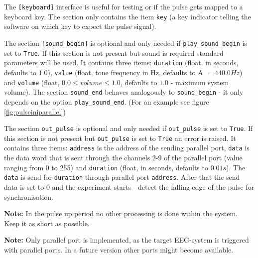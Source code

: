 \documentclass[12pt,a4paper]{book}
\begin{document}
The \verb|[keyboard]| interface is useful for testing or if the pulse gets mapped to a keyboard key. The section only contains the item \verb|key| (a key indicator telling the software on which key to expect the pulse signal).

The section \verb|[sound_begin]| is optional and only needed if \verb|play_sound_begin| is set to \verb|True|. If this section is not present but sound is required standard parameters will be used. It contains three items: \verb|duration| (float, in seconds, defaults to $1.0$), \verb|value| (float, tone frequency in Hz, defaults to A $= 440.0 Hz$) and \verb|volume| (float, $0.0 \le volume \le 1.0$, defaults to $1.0$ - maximum system volume). The section \verb|sound_end| behaves analogously to \verb|sound_begin| - it only depends on the option \verb|play_sound_end|. (For an example see figure \ref{fig:pulseiniparallel})

The section \verb|out_pulse| is optional and only needed if \verb|out_pulse| is set to \verb|True|. If this section is not present but \verb|out_pulse| is set to \verb|True| an error is raised. It contains three items: \verb|address| is the address of the sending parallel port, \verb|data| is the data word that is sent through the channels 2-9 of the parallel port (value ranging from 0 to 255) and \verb|duration| (float, in seconds, defaults to $0.01 s$). The \verb|data| is send for \verb|duration| through parallel port \verb|address|. After that the send data is set to $0$ and the experiment starts - detect the falling edge of the pulse for synchronisation.

\textbf{Note:} In the pulse up period no other processing is done within the system. Keep it as short as possible.

\textbf{Note:} Only parallel port is implemented, as the target EEG-system is triggered with parallel ports. In a future version other ports might become available.
\end{document}
